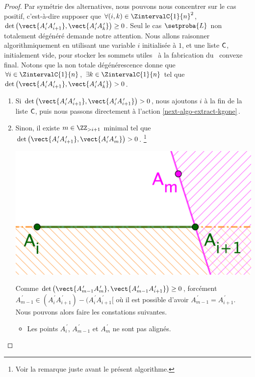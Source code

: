 \begin{proof}
    Par symétrie des alternatives, nous pouvons nous concentrer sur le cas positif, c'est-à-dire supposer que
    $\forall (i, k) \in \ZintervalC{1}{n}^2$,
	$\det \big( \vect{A^{\,\prime}_i A^{\,\prime}_{i+1}}, \vect{A^{\,\prime}_i A^{\,\prime}_k} \big) \geq 0$.
	Seul le cas $\setproba{L}$ non totalement dégénéré demande notre attention.
	Nous allons raisonner algorithmiquement en utilisant
	une variable $i$ initialisée à $1$, 
	et une liste $\mathsf{C}$, initialement vide, pour stocker les sommets \og utiles \fg\ à la fabrication du \kgone\ convexe final.
	Notons que la non totale dégénérescence donne que 
    $\forall i \in \ZintervalC{1}{n}$,
    $\exists k \in \ZintervalC{1}{n}$
    tel que
	$\det \big( \vect{A^{\,\prime}_i A^{\,\prime}_{i+1}}, \vect{A^{\,\prime}_i A^{\,\prime}_k} \big) > 0$.
	\begin{enumerate}[label=\fbox{\small\bfseries\textsf{A\kern.25pt\arabic*}}]
    	\item \label{start-algo-extract-kgone}
	    Si 
		$\det \big( \vect{A^{\,\prime}_i A^{\,\prime}_{i+1}}, \vect{A^{\,\prime}_i A^{\,\prime}_{i+1}} \big) > 0$,
		nous ajoutons $i$ à la fin de la liste $\mathsf{C}$,
		puis nous passons directement à l'action \ref{next-algo-extract-kgone}\,.


    	\item Sinon, il existe 
	    $m \in \ZZ_{>i+1}$ minimal tel que
		$\det \big( \vect{A^{\,\prime}_i A^{\,\prime}_{i+1}}, \vect{A^{\,\prime}_i A^{\,\prime}_m} \big) > 0$.%
		\footnote{
		    Voir la remarque juste avant le présent algorithme.
		}
        \begin{center}
        	\includegraphics[scale=.4]{content/polygon/at-least-one/next-extract-kgone.png}
        \end{center}
        
        \noindent
        Comme 
        $\det \big( \vect{A^{\,\prime}_{m-1} A^{\,\prime}_m}, \vect{A^{\,\prime}_{m-1} A^{\,\prime}_{i+1}} \big) \geq 0$, 
        forcément 
        $A^{\,\prime}_{m-1} \in (A^{\,\prime}_i A^{\,\prime}_{i+1}) - (A^{\,\prime}_i A^{\,\prime}_{i+1}[$ 
        où il est possible d'avoir $A^{\,\prime}_{m-1} = A^{\,\prime}_{i+1}$.
        Nous pouvons alors faire les constations suivantes.
        \begin{itemize}
            \item Les points $A^{\,\prime}_i$, $A^{\,\prime}_{m-1}$ et $A^{\,\prime}_m$ ne sont pas alignés.


\end{itemize}
\end{enumerate}
\end{proof}

